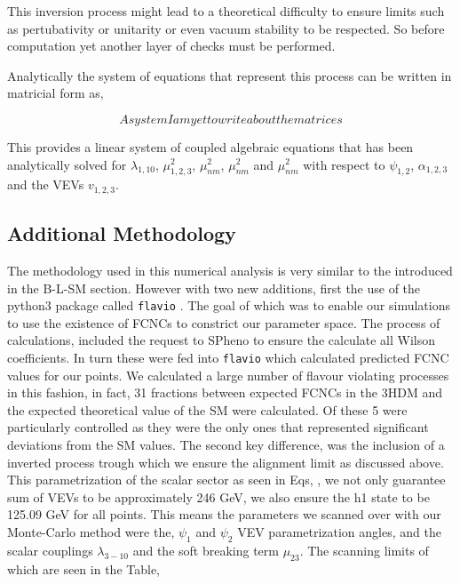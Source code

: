 This inversion process might lead to a theoretical difficulty to ensure limits such as pertubativity or unitarity or even vacuum stability to be respected. So before computation yet another layer of checks must be performed. 

Analytically the system of equations that represent this process can be written in matricial form as, 

\begin{equation}
    A system I am yet to write about the matrices 
\end{equation}

This provides a linear system of coupled algebraic equations that has been analytically solved for $\lambda_{1,10}$, $\mu^2_{1,2,3}$, $\mu_{nm}^2$, $\mu_{nm}^2$ and $\mu_{nm}^2$ with respect to $\psi_{1,2}$, $\alpha_{1,2,3}$ and the VEVs $v_{1,2,3}$.   

\subsection{Additional Methodology}

The methodology used in this numerical analysis is very similar to the introduced in the B-L-SM section. However with two new additions, first the use of the python3 package called \texttt{flavio}  \cite{straub2018flavio}.
%
The goal of which was to enable our simulations to use the existence of FCNCs to constrict our parameter space. 
%
The process of calculations, included the request to SPheno to ensure the calculate all Wilson coefficients. 
%
In turn these were fed into \texttt{flavio} which calculated predicted FCNC values for our points.  
% 
We calculated a large number of flavour violating processes in this fashion, in fact, 31 fractions between expected FCNCs in the 3HDM and the expected theoretical value of the SM were calculated. 
%
Of these 5 were particularly controlled as they were the only ones that represented significant deviations from the SM values.  
% 
The second key difference, was the inclusion of a inverted process trough which we ensure the alignment limit as discussed above.
%
This parametrization of the scalar sector as seen in Eqs, , we not only guarantee sum of VEVs to be approximately 246 GeV, we also ensure the h1 state to be 125.09 GeV for all points.
% 
This means the parameters we scanned over with our Monte-Carlo method were the, $\psi_1$ and $\psi_2$ VEV parametrization angles, and the scalar couplings $\lambda_{3-10}$ and the soft breaking term $\mu_{23}$. The scanning limits of which are seen in the Table,

